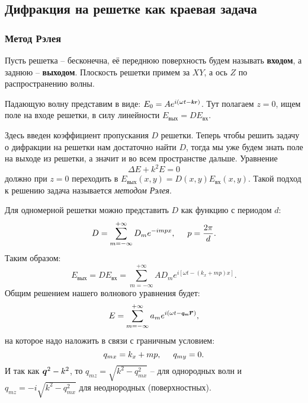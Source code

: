 \subsection{Дифракция на решетке как краевая задача}

\subsubsection{Метод Рэлея}
Пусть решетка -- бесконечна, её переднюю поверхность будем называть \textbf{входом}, а заднюю -- \textbf{выходом}. Плоскость решетки примем за $XY$, а ось $Z$ по распространению волны.

Падающую волну представим в виде: $E_0 = A e^{i (\omega t - \smallvc{k} \smallvc{r})}$.
Тут полагаем $z = 0$, ищем поле на входе решетки, в силу линейности $E_{\text{вых}} = D E_{\text{вх}}$.

Здесь введен коэффициент пропускания $D$ решетки. 
Теперь чтобы решить задачу о дифракции на решетки нам достаточно найти $D$, тогда мы уже будем знать поле на выходе из решетки, а значит и во всем пространстве дальше. Уравнение
\begin{equation*}
	\Delta E + k^2 E = 0
\end{equation*}
должно при $z = 0$ переходить в $E_{\text{вых}}(x,y) = D(x,y) E_{\text{вх}}(x,y)$. Такой подход к решению задача называется \textit{методом Рэлея}.

Для одномерной решетки можно представить $D$ как функцию с периодом $d$:
\begin{equation*}
	D = \sum_{m =- \infty}^{+\infty}D_m e^{-i m p x},
	\hspace{0.5 cm}
	p =\frac{2 \pi}{d}.
\end{equation*}
Таким образом:
\begin{equation*}
	E_\text{вых} = D E_\text{вх} = \sum_{m = - \infty}^{+\infty} A D_m e^{i [\omega t - (k_x + m p)x]}.
\end{equation*}
Общим решением нашего волнового уравнения будет:
\begin{equation*}
	E = \sum_{m = - \infty}^{+\infty} a_m e^{i(\omega t - \smallvc{q_m} \vc{r})},
\end{equation*}
на которое надо наложить в связи с граничным условием:
\begin{equation*}
	q_{mx} = k_x + m p, \hspace{0.5 cm} q_{m y} = 0.
\end{equation*}
И так как $\mbox{\boldmath $q$}^2 - k^2$, то $q_{mz} = \sqrt{k^2 - q_{mx}^2}$ -- для однородных волн и $q_{mz} = -i \sqrt{k^2 - q_{mx}^2}$ для неоднородных (поверхностных).

